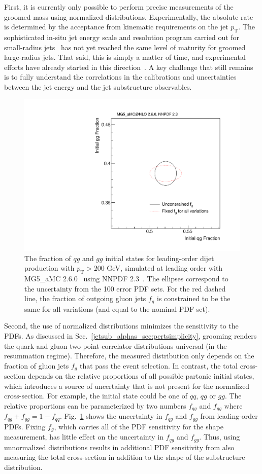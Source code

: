 \documentclass[11pt]{cernrep}
\begin{document}
First, it is currently only possible to perform precise measurements of the groomed mass using normalized distributions.
%
Experimentally, the absolute rate is determined by the acceptance from kinematic requirements on the jet $p_\mathrm{T}$.
%
The sophisticated in-situ jet energy scale and resolution program carried out for small-radius jets~\cite{Aad:2014bia,Aaboud:2017jcu,Khachatryan:2016kdb,CMS-DP-2016-020} has not yet reached the same level of maturity for groomed large-radius jets.
%
That said, this is simply a matter of time, and experimental efforts have already started in this direction~\cite{ATLAS-CONF-2017-063}.
%
A key challenge that still remains is to fully understand the correlations in the calibrations and uncertainties between the jet energy and the jet substructure observables.

\begin{figure}[t]
\begin{center}
\includegraphics[width = 0.5\columnwidth]{jetsub_alphas_PDFs.pdf}
\end{center}
\caption{The fraction of $qg$ and $gg$ initial states for leading-order dijet production with $p_\mathrm{T}>200$ GeV, simulated at leading order with MG5\_aMC 2.6.0~\cite{Alwall:2014hca} using NNPDF 2.3~\cite{Ball:2012cx}.  The ellipses correspond to the uncertainty from the 100 error PDF sets.  For the red dashed line, the fraction of outgoing gluon jets $f_g$ is constrained to be the same for all variations (and equal to the nominal PDF set).}
\label{jetsub_alphas_fig:pdf}
\end{figure}

Second, the use of normalized distributions minimizes the sensitivity to the PDFs.
%
As discussed in Sec.~\ref{jetsub_alphas_sec:pertsimplicity}, grooming renders the quark and gluon two-point-correlator distributions universal (in the resummation regime).
%
Therefore, the measured distribution only depends on the fraction of gluon jets $f_g$ that pass the event selection.
%
In contrast, the total cross-section depends on the relative proportions of all possible partonic initial states, which introduces a source of uncertainty that is not present for the normalized cross-section.
%
For example, the initial state could be one of $qq$, $qg$ or $gg$.
%
The relative proportions can be parameterized by two numbers $f_{qg}$ and $f_{gg}$ where $f_{qg}+f_{gg}=1-f_{qq}$.
%
Fig.~\ref{jetsub_alphas_fig:pdf} shows the uncertainty in $f_{qg}$ and $f_{gg}$ from leading-order PDFs.
%
Fixing $f_g$, which carries all of the PDF sensitivity for the shape measurement, has little effect on the uncertainty in $f_{qg}$ and $f_{gg}$.
%
Thus, using unnormalized distributions results in additional PDF sensitivity from also measuring the total cross-section in addition to the shape of the substructure distribution. 
\end{document}

